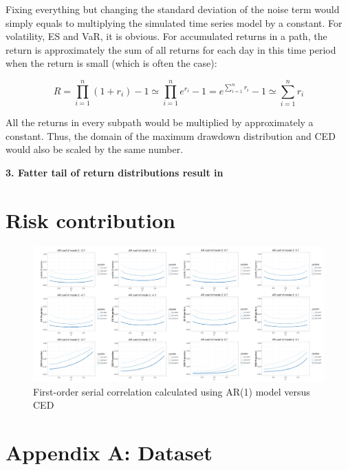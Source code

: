 \documentclass[11pt]{article}
\begin{document}
Fixing everything but changing the standard deviation of the noise term would simply equals to multiplying the simulated time series model by a constant. For volatility, ES and VaR, it is obvious. For accumulated returns in a path, the return is approximately the sum of all returns for each day in this time period when the return is small (which is often the case):

\begin{equation}
R = \prod_{i=1}^n (1+r_i) - 1 \simeq \prod_{i=1}^n e^{r_i} - 1 = e^{\sum_{i=1}^n r_i} - 1 
 \simeq  \sum_{i=1}^n r_i
\end{equation}

All the returns in every subpath would be multiplied by approximately a constant. Thus, the domain of the maximum drawdown distribution and CED would also be scaled by the same number.

\textbf{3. Fatter tail of return distributions result in }

\section{Risk contribution}

\begin{figure}[H]
  \centering
  \includegraphics[width=1.05\textwidth]{../figures/risk_contribution/risk_contribution_simulation_all}
  \caption{First-order serial correlation calculated using AR(1) model versus CED}
  \label{fig:simulation_risk_contribution}
\end{figure}




\clearpage





\clearpage

\newpage
\appendix
\section{Appendix A: Dataset} \label{App:AppendixA}
\end{document}
